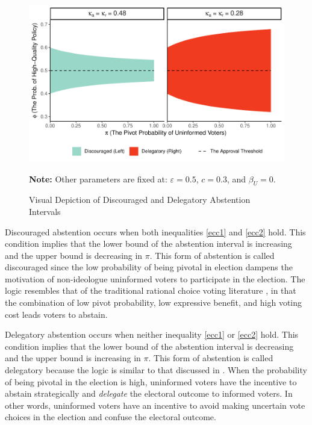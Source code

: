 \documentclass[doc,natbib,12pt]{apa6}
\newcommand{\floatnote}[1]{\vspace{\abovecaptionskip}\caption*{\textbf{Note:} #1}\vspace{-\abovecaptionskip}}
\begin{document}
	\begin{figure}[t!]
		\caption{ Visual Depiction of Discouraged and Delegatory Abstention Intervals}
		\label{fig:abgraph}
		\includegraphics[width=\linewidth]{figure/abgraph-1}
		\floatnote{Other parameters are fixed at: $\varepsilon=0.5$, $c=0.3$, and $\beta_U=0$.}
	\end{figure}
	
	\par Discouraged abstention occurs when both inequalities \ref{ecc1} and \ref{ecc2} hold. This condition implies that the lower bound of the abstention interval is increasing and the upper bound is decreasing in $\pi$. This form of abstention is called discouraged since the low probability of being pivotal in election dampens the motivation of non-ideologue uninformed voters to participate in the election. The logic resembles that of the traditional rational choice voting literature \citep{Downs1957anec, Riker1968thof, Matsusaka1995exvo}, in that the combination of low pivot probability, low expressive benefit, and high voting cost leads voters to abstain.
	
	\par Delegatory abstention occurs when neither inequality \ref{ecc1} or \ref{ecc2} hold. This condition implies that the lower bound of the abstention interval is decreasing and the upper bound is increasing in $\pi$. This form of abstention is called delegatory because the logic is similar to that discussed in \cite{Feddersen1996thsw, Feddersen1999abin}. When the probability of being pivotal in the election is high, uninformed voters have the incentive to abstain strategically and \textit{delegate} the electoral outcome to informed voters. In other words, uninformed voters have an incentive to avoid making uncertain vote choices in the election and confuse the electoral outcome. 
	
\end{document}
